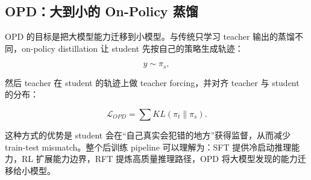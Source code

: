 \subsection{OPD：大到小的 On-Policy 蒸馏}

OPD 的目标是把大模型能力迁移到小模型。与传统只学习 teacher 输出的蒸馏不同，on-policy distillation 让 student 先按自己的策略生成轨迹：

\begin{equation}
    y \sim \pi_s,
\end{equation}

然后 teacher 在 student 的轨迹上做 teacher forcing，并对齐 teacher 与 student 的分布：

\begin{equation}
    \mathcal{L}_{OPD}
    = \sum KL(\pi_t \| \pi_s).
\end{equation}

这种方式的优势是 student 会在“自己真实会犯错的地方”获得监督，从而减少 train-test mismatch。整个后训练 pipeline 可以理解为：SFT 提供冷启动推理能力，RL 扩展能力边界，RFT 提炼高质量推理路径，OPD 将大模型发现的能力迁移给小模型。
